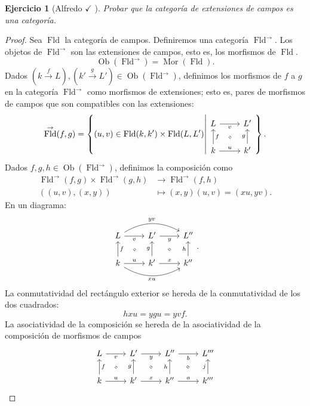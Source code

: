 \documentclass[12pt,letterpaper,titlepage]{article}
\newtheorem{exe}{Ejercicio}
\theoremstyle{definition}
\newcommand\rar[1]{\xrightarrow{#1}}
\newcommand\<{\langle}
\renewcommand\>{\rangle}
\DeclareMathOperator{\Ob}{Ob}
\DeclareMathOperator{\Mor}{Mor}
\DeclareMathOperator{\Fld}{Fld}
\begin{document}
\begin{exe}[Alfredo $\checkmark$ ]
  Probar que la categoría de extensiones de campos es una categoría.
\end{exe}
\begin{proof}
  Sea $\Fld$ la categoría de campos.
  Definiremos una categoría $\Fld^\to$.
  Los objetos de $\Fld^\to$ son las extensiones de campos, esto es,
  los morfismos de $\Fld$.
  \[
    \Ob(\Fld^\to) = \Mor(\Fld)
  .\]
  Dados $(k\rar f L),(k'\rar gL')\in\Ob(\Fld^\to)$, definimos
  los morfismos de $f$ a $g$ en la categoría $\Fld^\to$
  como morfismos de extensiones; esto es,
  pares de morfismos de campos que son compatibles con
  las extensiones:
  \[
    \Fld^\to(f,g)
    = \left\{
      (u,v)\in \Fld(k,k')\times \Fld(L,L')
      \middle|
      \begin{tikzcd}
        L \ar[r,"v"'] & L' \\
        k \ar[u,"f"'] \ar[r,"u"] & k' \ar[u,"g"]
        \ar[equal,from=1-1,to=2-2,shorten=5mm]
      \end{tikzcd}
    \right\}
  .\]
  Dados $f,g,h\in\Ob(\Fld^\to)$, definimos la composición como
  \begin{align*}
    \Fld^\to(f,g)\times\Fld^\to(g,h) &\to \Fld^\to(f,h) \\
    ((u,v) , (x,y)) &\mapsto (x,y)(u,v)=(xu,yv).
  \end{align*}
  En un diagrama:
  \[
      \begin{tikzcd}
        L \ar[r,"v"'] \ar[rr,bend left,"yv"] & L' \ar[r,"y"'] & L''\\
        k \ar[u,"f"'] \ar[r,"u"] \ar[rr,bend right,"xu"']
        & k' \ar[u,"g"] \ar[r,"x"] & k''\ar[u,"h"]
        \ar[equal,from=1-1,to=2-2,shorten=5mm]
        \ar[equal,from=1-2,to=2-3,shorten=5mm]
      \end{tikzcd}
  .\]
  La conmutatividad del rectángulo exterior se hereda de la
  conmutatividad de los dos cuadrados:
    \[
        hxu = ygu = yvf
    .\]
  La asociatividad de la composición se hereda de la
  asociatividad de la composición de morfismos de campos
  \[
      \begin{tikzcd}
        L \ar[r,"v"'] & L' \ar[r,"y"'] & L'' \ar[r,"b"'] & L'''\\
        k \ar[u,"f"'] \ar[r,"u"]
        & k' \ar[u,"g"] \ar[r,"x"]
        & k''\ar[u,"h"] \ar[r,"a"]
        & k''' \ar[u,"j"]
        \ar[equal,from=1-1,to=2-2,shorten=5mm]
        \ar[equal,from=1-2,to=2-3,shorten=5mm]
        \ar[equal,from=1-3,to=2-4,shorten=5mm]
      \end{tikzcd}
\]
\end{proof}
\end{document}

